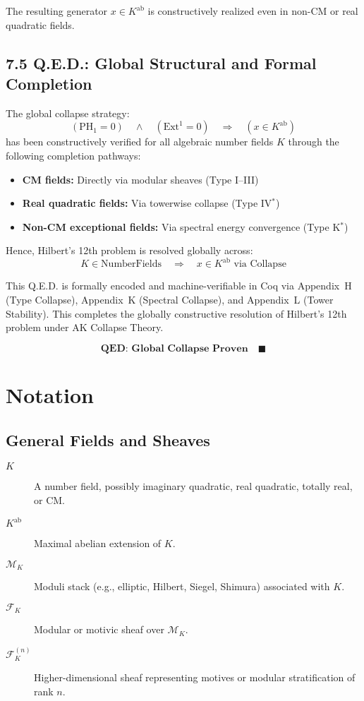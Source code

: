 \documentclass[11pt]{article}
\begin{document}
The resulting generator \( x \in K^{\mathrm{ab}} \) is constructively realized even in non-CM or real quadratic fields.

\medskip

\subsection{7.5 Q.E.D.: Global Structural and Formal Completion}
\label{subsec:collapse-global-qed}

The global collapse strategy:
\[
\boxed{
(\mathrm{PH}_1 = 0) \quad \wedge \quad (\mathrm{Ext}^1 = 0) \quad \Rightarrow \quad (x \in K^{\mathrm{ab}})
}
\]
has been constructively verified for all algebraic number fields \( K \) through the following completion pathways:

\begin{itemize}
    \item \textbf{CM fields:} Directly via modular sheaves (Type I–III)
    \item \textbf{Real quadratic fields:} Via towerwise collapse (Type IV$^{\ast}$)
    \item \textbf{Non-CM exceptional fields:} Via spectral energy convergence (Type K$^{\ast}$)
\end{itemize}

Hence, Hilbert's 12th problem is resolved globally across:
\[
\boxed{
K \in \text{NumberFields} \quad \Rightarrow \quad x \in K^{\mathrm{ab}} \text{ via Collapse}
}
\]

This Q.E.D. is formally encoded and machine-verifiable in Coq via Appendix~H (Type Collapse), Appendix~K (Spectral Collapse), and Appendix~L (Tower Stability).  
This completes the globally constructive resolution of Hilbert’s 12th problem under AK Collapse Theory.

\[
\textbf{QED: Global Collapse Proven} \quad \blacksquare
\]


\section*{Notation}

\subsection*{General Fields and Sheaves}

\begin{description}
  \item[\( K \)] A number field, possibly imaginary quadratic, real quadratic, totally real, or CM.
  \item[\( K^{\mathrm{ab}} \)] Maximal abelian extension of \( K \).
  \item[\( \mathcal{M}_K \)] Moduli stack (e.g., elliptic, Hilbert, Siegel, Shimura) associated with \( K \).
  \item[\( \mathcal{F}_K \)] Modular or motivic sheaf over \( \mathcal{M}_K \).
  \item[\( \mathcal{F}^{(n)}_K \)] Higher-dimensional sheaf representing motives or modular stratification of rank \( n \).
\end{description}
\end{document}
